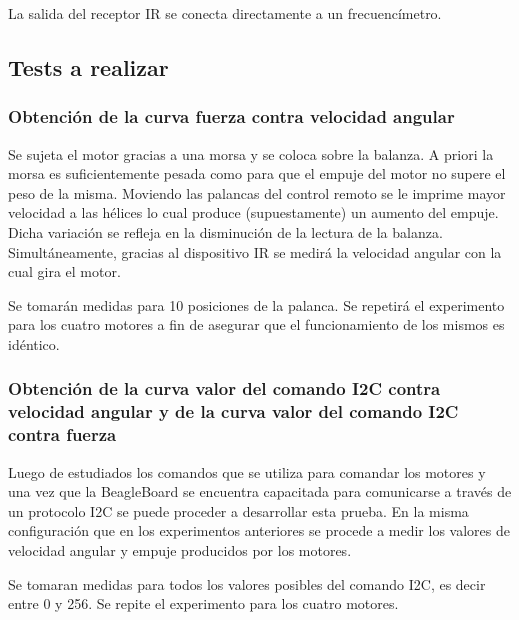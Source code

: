 \documentclass[spanish,12pt,a4paper,titlepage]{report}
\begin{document}
La salida del receptor IR se conecta directamente a un frecuencímetro. 

\subsection{Tests a realizar}

\subsubsection*{Obtención de la curva fuerza contra velocidad angular}

Se sujeta el motor gracias a una morsa y se coloca sobre la balanza. A priori la morsa es suficientemente pesada como para que el empuje del motor no supere el peso de la misma. Moviendo las palancas del control remoto se le imprime mayor velocidad a las hélices lo cual produce (supuestamente) un aumento del empuje. Dicha variación se refleja en la disminución de la lectura de la balanza. 
Simultáneamente, gracias al dispositivo IR se medirá la velocidad angular con la cual gira el motor. 

Se tomarán medidas para 10 posiciones de la palanca.
Se repetirá el experimento para los cuatro motores a fin de asegurar que el funcionamiento de los mismos es idéntico.



\subsubsection*{Obtención de la curva valor del comando I2C contra velocidad angular y de la curva valor del comando I2C contra fuerza}

Luego de estudiados los comandos que se utiliza para comandar los motores y una vez que la BeagleBoard se encuentra capacitada para comunicarse a través de un protocolo I2C se puede proceder a desarrollar esta prueba. En la misma configuración que en los experimentos anteriores se procede a medir los valores de velocidad angular y empuje producidos por los motores. 

Se tomaran medidas para todos los valores posibles del comando I2C, es decir entre 0 y 256.
Se repite el experimento para los cuatro motores.
\end{document}
